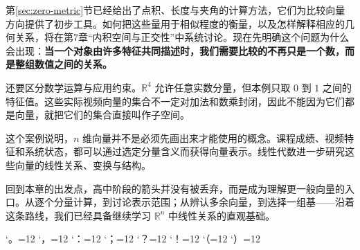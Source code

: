 \documentclass[a4paper,12pt,twoside,openany,fontset=none]{ctexbook}
\numberwithin{equation}{chapter}
\begin{document}
第\ref{sec:zero-metric}节已经给出了点积、长度与夹角的计算方法，它们为比较向量方向提供了初步工具。如何把这些量用于相似程度的衡量，以及怎样解释相应的几何关系，将在第7章“内积空间与正交性”中系统讨论。现在先明确这个问题为什么会出现：\textbf{当一个对象由许多特征共同描述时，我们需要比较的不再只是一个数，而是整组数值之间的关系。}

还要区分数学运算与应用约束。$\mathbb{R}^4$ 允许任意实数分量，但本例只取 $0$ 到 $1$ 之间的特征值。这些实际视频向量的集合不一定对加法和数乘封闭，因此不能因为它们都是向量，就把它们的集合直接叫作子空间。

这个案例说明，$n$ 维向量并不是必须先画出来才能使用的概念。课程成绩、视频特征和系统状态，都可以通过选定分量含义而获得向量表示。线性代数进一步研究这些向量的线性关系、变换与结构。

回到本章的出发点，高中阶段的箭头并没有被丢弃，而是成为理解更一般向量的入口。从逐个分量计算，到讨论表示范围；从辨认多余向量，到选择一组基——沿着这条路线，我们已经具备继续学习 $\mathbb{R}^n$ 中线性关系的直观基础。

\par\clearpage
\endgroup


\begingroup
\catcode`。=12
\catcode`，=12
\catcode`：=12
\catcode`；=12
\catcode`？=12
\catcode`！=12
\catcode`（=12
\catcode`）=12
\end{document}
